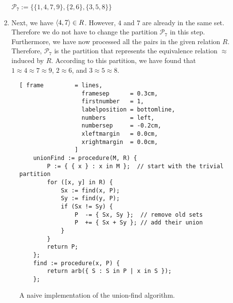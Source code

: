 \begin{enumerate}
      \\[0.2cm]
      \hspace*{1.3cm}
      $\mathcal{P}_7 := \bigl\{ \{1, 4, 7, 9\}, \{2,6\}, \{3,5,8\} \bigr\}$
\item Next, we have $\pair(4,7) \in R$.  However, $4$ and $7$ are already in the same set.
      Therefore we do not have to change the partition $\mathcal{P}_7$ in this step.
      Furthermore, we have now processed all the pairs in the given relation $R$.
      Therefore, $\mathcal{P}_7$ is the partition that represents the equivalence relation $\approx$ induced
      by $R$.  According to this partition, we have found that
      \\[0.2cm]
      \hspace*{1.3cm}
      $1 \approx 4 \approx 7 \approx 9$, \quad $2 \approx 6$,  \quad and \quad $3 \approx 5 \approx 8$.
\end{enumerate}
 

\begin{figure}[!ht]
\centering
\begin{Verbatim}[ frame         = lines, 
                  framesep      = 0.3cm, 
                  firstnumber   = 1,
                  labelposition = bottomline,
                  numbers       = left,
                  numbersep     = -0.2cm,
                  xleftmargin   = 0.0cm,
                  xrightmargin  = 0.0cm,
                ]
    unionFind := procedure(M, R) {
        P := { { x } : x in M };  // start with the trivial partition
        for ([x, y] in R) {
            Sx := find(x, P);
            Sy := find(y, P);
            if (Sx != Sy) {
                P  -= { Sx, Sy };  // remove old sets
                P  += { Sx + Sy }; // add their union
            }
        }
        return P;
    };
    find := procedure(x, P) {
        return arb({ S : S in P | x in S });
    };
\end{Verbatim}
\vspace*{-0.3cm}
\caption{A naive implementation of the union-find algorithm.}
\label{fig:union-find-naive.stlx}
\end{figure}

